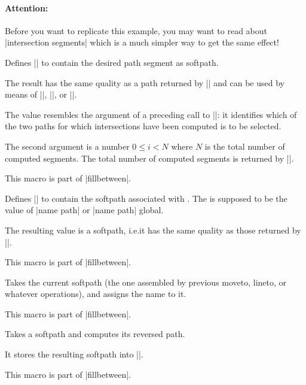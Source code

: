 \begin{command}{\pgfcomputeintersectionsegments{}}
    \paragraph{Attention:}

    Before you want to replicate this example, you may want to read about
    |intersection segments| which is a much simpler way to get the same effect!
\end{command}

\begin{command}{\pgfgetintersectionsegmentpath{}}
    Defines |\pgfretval| to contain the desired path segment as softpath.

    The result has the same quality as a path returned by |\pgfgetpath| and can
    be used by means of |\pgfsetpath|, |\pgfsetpathandBB|, or
    |\pgfaddpathandBB|.

    The value  resembles the argument of a preceding call to
    |\pgfcomputeintersectionsegments|: it identifies which of the two paths for
    which intersections have been computed is to be selected.

    The second argument  is a number $0 \le i < N$ where $N$ is the
    total number of computed segments. The total number of computed segments is
    returned by |\pgfcomputeintersectionsegments|.

    This macro is part of |fillbetween|.
\end{command}

\begin{command}{\tikzgetnamedpath{}}
    Defines |\pgfretval| to contain the softpath associated with . The  is supposed to be the value of |name path| or
    |name path| global.

    The resulting value is a softpath, i.e.\@ it has the same quality as those
    returned by |\pgfgetpath|.

    This macro is part of |fillbetween|.
\end{command}

\begin{command}{\tikznamecurrentpath{}}
    Takes the current softpath (the one assembled by previous moveto, lineto,
    or whatever operations), and assigns the name  to it.

    This macro is part of |fillbetween|.
\end{command}

\begin{command}{\pgfcomputereversepath{}}
    Takes a softpath  and computes its
    reversed path.

    It stores the resulting softpath into |\pgfretval|.

    This macro is part of |fillbetween|.
\end{command}

